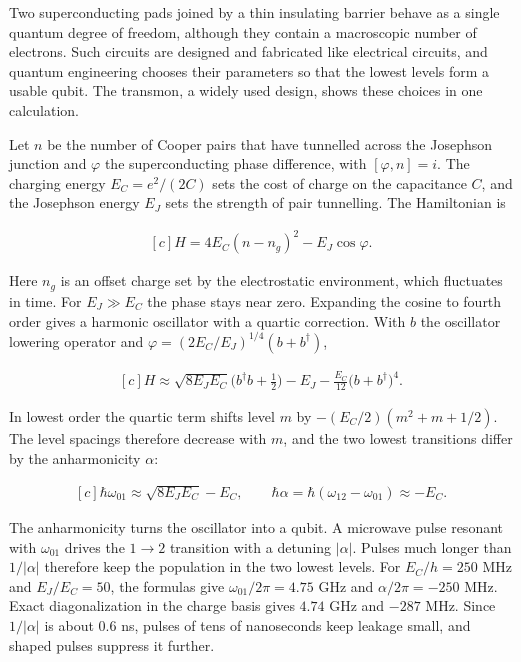 \documentclass[11pt,oneside]{book}
\newenvironment{centeredalign}{\[\begin{gathered}[c]}{\end{gathered}\]}
\begin{document}
\label{topic:quantum-engineering}

Two superconducting pads joined by a thin insulating barrier behave as a single quantum degree of freedom, although they contain a macroscopic number of electrons. Such circuits are designed and fabricated like electrical circuits, and quantum engineering chooses their parameters so that the lowest levels form a usable qubit. The transmon, a widely used design, shows these choices in one calculation.

Let \(n\) be the number of Cooper pairs that have tunnelled across the Josephson junction and \(\varphi\) the superconducting phase difference, with \([\varphi,n]=i\). The charging energy \(E_C=e^2/(2C)\) sets the cost of charge on the capacitance \(C\), and the Josephson energy \(E_J\) sets the strength of pair tunnelling. The Hamiltonian is

\begin{centeredalign}
H=4E_C(n-n_g)^2-E_J\cos\varphi.
\end{centeredalign}

Here \(n_g\) is an offset charge set by the electrostatic environment, which fluctuates in time. For \(E_J\gg E_C\) the phase stays near zero. Expanding the cosine to fourth order gives a harmonic oscillator with a quartic correction. With \(b\) the oscillator lowering operator and \(\varphi=(2E_C/E_J)^{1/4}(b+b^\dagger)\),

\begin{centeredalign}
H\approx\sqrt{8E_JE_C}\Big(b^\dagger b+\frac12\Big)-E_J-\frac{E_C}{12}\big(b+b^\dagger\big)^4.
\end{centeredalign}

In lowest order the quartic term shifts level \(m\) by \(-(E_C/2)(m^2+m+1/2)\). The level spacings therefore decrease with \(m\), and the two lowest transitions differ by the anharmonicity \(\alpha\):

\begin{centeredalign}
\hbar\omega_{01}\approx\sqrt{8E_JE_C}-E_C,\qquad
\hbar\alpha=\hbar(\omega_{12}-\omega_{01})\approx-E_C.
\end{centeredalign}

The anharmonicity turns the oscillator into a qubit. A microwave pulse resonant with \(\omega_{01}\) drives the \(1\to2\) transition with a detuning \(|\alpha|\). Pulses much longer than \(1/|\alpha|\) therefore keep the population in the two lowest levels. For \(E_C/h=250\) MHz and \(E_J/E_C=50\), the formulas give \(\omega_{01}/2\pi=4.75\) GHz and \(\alpha/2\pi=-250\) MHz. Exact diagonalization in the charge basis gives \(4.74\) GHz and \(-287\) MHz. Since \(1/|\alpha|\) is about \(0.6\) ns, pulses of tens of nanoseconds keep leakage small, and shaped pulses suppress it further.
\end{document}
